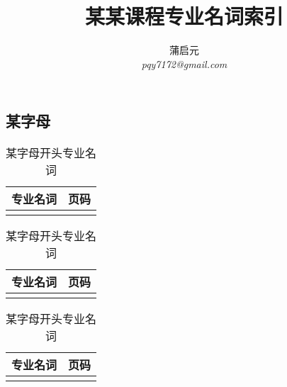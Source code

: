 \documentclass{wx672article}
\title{某某课程专业名词索引}
\author{蒲启元 \\
 \emph{pqy7172@gmail.com}}
\begin{document}
\maketitle{}

\begin{center}
  \section*{某字母}
\end{center}
\label{sec:}


 \begin{table}[h!] %
      \centering
        \begin{tabular}[t]{c|c} %
          \hline
          专业名词 &  页码   \\
          \hline
           &  \\
          \hline
        \end{tabular}
        \hfill
        \begin{tabular}[t]{c|c}
          \hline
          专业名词  &  页码  \\
          \hline
           &  \\
          \hline
        \end{tabular}
        \hfill
        \begin{tabular}[t]{c|c}
          \hline
          专业名词 &  页码 \\
          \hline
           &  \\
          \hline
        \end{tabular}
        \caption{某字母开头专业名词}\label{tab}
    \end{table}
\end{document}
